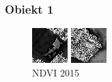 \documentclass[a4paper,12pt]{article}  %
\begin{document}
\subsubsection{Obiekt 1}
\begin{figure}[H]
    \centering
    \begin{minipage}{0.24\textwidth}
        \centering
        \includegraphics[width=\linewidth]{spektralne/ndvi_budynek7_2015.png}
        \caption*{NDVI 2015}
    \end{minipage}
    \begin{minipage}{0.24\textwidth}
        \centering
        \includegraphics[width=\linewidth]{spektralne/ndvi_budynek7_2023.png}

\end{minipage}
\end{figure}
\end{document}
